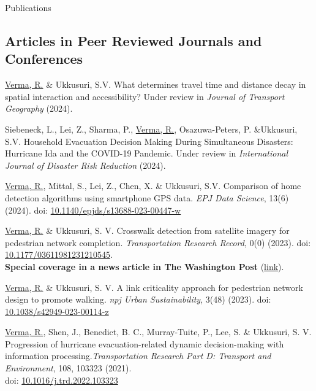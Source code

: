 \documentclass{CV} %
\begin{document}
\begin{rSection}{Publications}
    \subsection*{Articles in Peer Reviewed Journals and Conferences}
    \begin{etaremune}
        \item \underline{Verma, R.} \& Ukkusuri, S.V. What determines travel time and distance decay in spatial interaction and accessibility? Under review in \textit{Journal of Transport Geography} (2024).

        \item Siebeneck, L., Lei, Z., Sharma, P., \underline{Verma, R.}, Osazuwa-Peters, P. \&Ukkusuri, S.V. Household Evacuation Decision Making During Simultaneous Disasters: Hurricane Ida and the COVID-19 Pandemic. Under review in \textit{International Journal of Disaster Risk Reduction} (2024).

        \item \underline{Verma, R.}, Mittal, S., Lei, Z., Chen, X. \& Ukkusuri, S.V. Comparison of home detection algorithms using smartphone GPS data.
        \textit{EPJ Data Science}, 13(6) (2024). doi: \href{https://doi.org/10.1140/epjds/s13688-023-00447-w}{10.1140/epjds/s13688-023-00447-w}
        
        \item \underline{Verma, R.} \& Ukkusuri, S. V. Crosswalk detection from satellite imagery for pedestrian network completion. \textit{Transportation Research Record}, 0(0) (2023). doi: \href{https://doi.org/10.1177/03611981231210545}{10.1177/03611981231210545}.
        \\ \textbf{Special coverage in a news article in The Washington Post} (\href{https://www.washingtonpost.com/transportation/2023/02/25/sidewalks-crosswalks-study/}{link}).
        
        \item \underline{Verma, R.} \& Ukkusuri, S. V. A link criticality approach for pedestrian network design to promote walking. \textit{npj Urban Sustainability}, 3(48) (2023). doi: \href{https://doi.org/10.1038/s42949-023-00114-z}{10.1038/s42949-023-00114-z}
        
        \item \underline{Verma, R.}, Shen, J., Benedict, B. C., Murray-Tuite, P., Lee, S. \& Ukkusuri, S. V. Progression of hurricane evacuation-related dynamic decision-making with information processing.\textit{Transportation Research Part D: Transport and Environment}, 108, 103323 (2021).\\doi: \href{https://doi.org/10.1016/j.trd.2022.103323}{10.1016/j.trd.2022.103323}
        

\end{etaremune}
\end{rSection}
\end{document}
